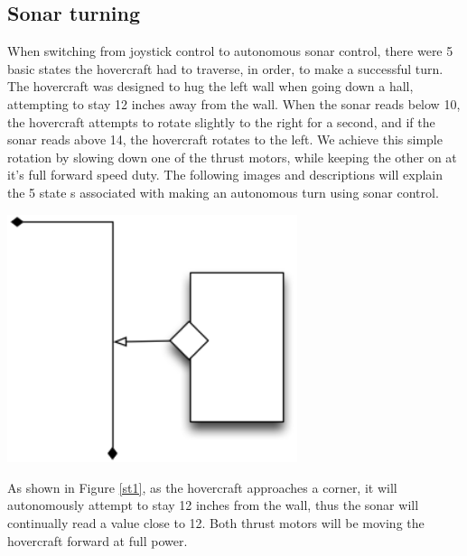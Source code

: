 \subsection{Sonar turning}
When switching from joystick control to autonomous sonar control, there were 5 basic states the hovercraft had to traverse, in order, to make a successful turn. The hovercraft was designed to hug the left wall when going down a hall, attempting to stay 12 inches away from the wall. When the sonar reads below 10, the hovercraft attempts to rotate slightly to the right for a second, and if the sonar reads above 14, the hovercraft rotates to the left. We achieve this simple rotation by slowing down one of the thrust motors, while keeping the other on at it's full forward speed duty. The following images and descriptions will explain the 5 state s associated with making an autonomous turn using sonar control.

\begin{center}
 \includegraphics[width=85mm]{imageSources/sonarturn1.png}
\end{center}
\label{st1}

As shown in Figure \ref{st1}, as the hovercraft approaches a corner, it will autonomously attempt to stay 12 inches from the wall, thus the sonar will continually read a value close to 12. Both thrust motors will be moving the hovercraft forward at full power.


